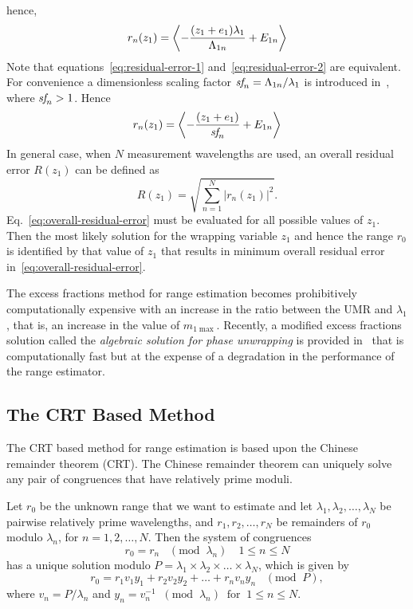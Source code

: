 hence,
\begin{equation}\label{eq:residual-error-2}
r_n (z_1) = \left\langle  - \dfrac{(z_1 + e_1)\lambda_1}{\Lambda_{1n}} + E_{1n} \right\rangle
\end{equation}
Note that equations~\ref{eq:residual-error-1} and~\ref{eq:residual-error-2} are equivalent. For convenience a dimensionless scaling factor $\emph{sf}_n= \Lambda_{1n}/\lambda_1$ is introduced in~\cite{Falaggis_excess_fractions_2011}, where $\emph{sf}_n> 1$. Hence
\begin{equation}\label{eq:residual-error-3}
r_n (z_1) = \left\langle  - \dfrac{(z_1 + e_1)}{\emph{sf}_n} + E_{1n} \right\rangle
\end{equation}
In general case, when $N$ measurement wavelengths are used, an overall residual error $R(z_1)$ can be defined as~\cite{Falaggis_excess_fractions_2011}
\begin{equation}\label{eq:overall-residual-error}
R(z_1) = \sqrt{ \sum_{n=1}^{N} | r_n(z_1) |^2  }. 
\end{equation}
Eq.~\ref{eq:overall-residual-error} must be evaluated for all possible values of $z_1$. Then the most likely solution for the wrapping variable $z_1$ and hence the range $r_0$ is identified by that value of $z_1$ that results in minimum overall residual error in~\ref{eq:overall-residual-error}.

The excess fractions method for range estimation becomes prohibitively computationally expensive with an increase in the ratio between the UMR and $\lambda_1$, that is, an increase in the value of $m_{1\max}$. Recently, a modified excess fractions solution called the \emph{algebraic solution for phase unwrapping} is provided in~\cite{Falaggis_algebraic_solution_2014} that is computationally fast but at the expense of a degradation in the performance of the range estimator.

\subsection{The CRT Based Method}
The CRT based method for range estimation is based upon the Chinese remainder theorem (CRT). The Chinese remainder theorem can uniquely solve any pair of congruences that have relatively prime moduli. 

Let $r_0$ be the unknown range that we want to estimate and let $\lambda_1, \lambda_2, \ldots,\lambda_N$ be pairwise relatively prime wavelengths, and $r_1,r_2,\ldots,r_N$ be remainders of $r_0$ modulo $\lambda_n$, for $n=1,2,\ldots,N$. Then the system of congruences 
 \[
 r_0 = r_n \;\;\; (\text{mod}\;\; \lambda_n) \quad 1\leq n \leq N
 \]
 has a unique solution modulo $P = \lambda_1 \times \lambda_2 \times \ldots \times \lambda_N$, which is given by
 \[
 r_0 = r_1 v_1 y_1 + r_2 v_2 y_2 + \ldots + r_n v_n y_n \;\;\; (\text{mod}\;\; P),
 \]
 where $v_n = P/\lambda_n$ and $y_n = v_n^{-1} \;\; (\text{mod}\;\; \lambda_n) \;\; \text{for} \;\; 1 \leq n \leq N$.

